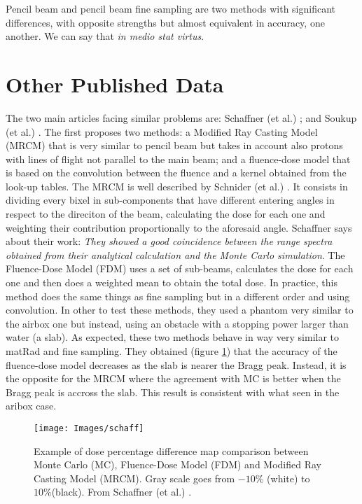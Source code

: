 \documentclass[12pt, a4paper, twoside]{book}
\begin{document}
Pencil beam and pencil beam fine sampling are two methods with significant differences, with opposite strengths but almost equivalent in accuracy, one another. We can say that \emph{in medio stat virtus}.


\section{Other Published Data}
The two main articles facing similar problems are: Schaffner (et al.) \cite{schaf:pba}; and Soukup (et al.) \cite{souk:pba}. 
The first proposes two methods: a Modified Ray Casting Model (MRCM) that is very similar to pencil beam but takes in account also protons with lines of flight not parallel to the main beam; and a fluence-dose model that is based on the convolution between the fluence and a kernel obtained from the look-up tables.
The MRCM is well described by Schnider (et al.) \cite{schn:pba}. It consists in dividing every bixel in sub-components that have different entering angles in respect to the direciton of the beam, calculating the dose for each one and weighting their contribution proportionally to the aforesaid angle. 
Schaffner says about their work: \emph{They showed a good coincidence between the range spectra obtained from their analytical calculation and the Monte Carlo simulation}.
The Fluence-Dose Model (FDM) uses a set of sub-beams, calculates the dose for each one and then does a weighted mean to obtain the total dose. In practice, this method does the same things as fine sampling but in a different order and using convolution.
In other to test these methods, they used a phantom very similar to the airbox one but instead, using an obstacle with a stopping power larger than water (a slab). As expected, these two methods behave in way very similar to matRad and fine sampling. They obtained (figure \ref{fig:schaff}) that the accuracy of the fluence-dose model decreases as the slab is nearer the Bragg peak. Instead, it is the opposite for the MRCM where the agreement with MC is better when the Bragg peak is accross the slab.
This result is consistent with what seen in the aribox case.


\begin{figure}[!t]
\centering
{\texttt{[image: Images/schaff]}} 
\caption{Example of dose percentage difference map comparison between Monte Carlo (MC), Fluence-Dose Model (FDM) and Modified Ray Casting Model (MRCM). Gray scale goes from $-10\%$ (white) to $10\%$(black). From Schaffner (et al.) \cite{schaf:pba}.}
\label{fig:schaff}
\end{figure}
\end{document}
